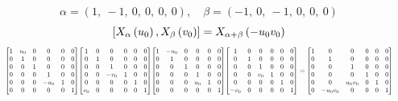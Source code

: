 \documentclass[11pt]{article}
\theoremstyle{definition}
\begin{document}
\[
\alpha = \left( 1, \  -1, \  0, \  0, \  0, \  0\right), \quad \beta = \left( -1, \  0, \  -1, \  0, \  0, \  0\right)
\]
\[
\scaletoalign{\textwidth}{\left[ X_{\alpha}\left(u_{0}\right), X_{\beta}\left(v_{0}\right) \right] = X_{\alpha + \beta}\left(- u_{0} v_{0}\right)}
\]
\[
\scaletoalign{\textwidth}{{\left[\begin{matrix}1 & u_{0} & 0 & 0 & 0 & 0\\0 & 1 & 0 & 0 & 0 & 0\\0 & 0 & 1 & 0 & 0 & 0\\0 & 0 & 0 & 1 & 0 & 0\\0 & 0 & 0 & - u_{0} & 1 & 0\\0 & 0 & 0 & 0 & 0 & 1\end{matrix}\right]} {\left[\begin{matrix}1 & 0 & 0 & 0 & 0 & 0\\0 & 1 & 0 & 0 & 0 & 0\\0 & 0 & 1 & 0 & 0 & 0\\0 & 0 & - v_{0} & 1 & 0 & 0\\0 & 0 & 0 & 0 & 1 & 0\\v_{0} & 0 & 0 & 0 & 0 & 1\end{matrix}\right]} {\left[\begin{matrix}1 & - u_{0} & 0 & 0 & 0 & 0\\0 & 1 & 0 & 0 & 0 & 0\\0 & 0 & 1 & 0 & 0 & 0\\0 & 0 & 0 & 1 & 0 & 0\\0 & 0 & 0 & u_{0} & 1 & 0\\0 & 0 & 0 & 0 & 0 & 1\end{matrix}\right]} {\left[\begin{matrix}1 & 0 & 0 & 0 & 0 & 0\\0 & 1 & 0 & 0 & 0 & 0\\0 & 0 & 1 & 0 & 0 & 0\\0 & 0 & v_{0} & 1 & 0 & 0\\0 & 0 & 0 & 0 & 1 & 0\\- v_{0} & 0 & 0 & 0 & 0 & 1\end{matrix}\right]} = {\left[\begin{matrix}1 & 0 & 0 & 0 & 0 & 0\\0 & 1 & 0 & 0 & 0 & 0\\0 & 0 & 1 & 0 & 0 & 0\\0 & 0 & 0 & 1 & 0 & 0\\0 & 0 & u_{0} v_{0} & 0 & 1 & 0\\0 & - u_{0} v_{0} & 0 & 0 & 0 & 1\end{matrix}\right]}}
\]
\end{document}
